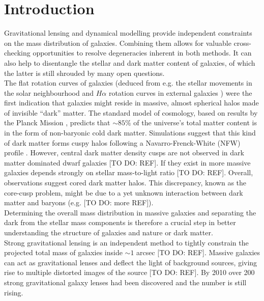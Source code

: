 \section{Introduction}

Gravitational lensing and dynamical modelling provide independent constraints on the mass distribution of galaxies. Combining them allows for valuable cross-checking opportunities to resolve degeneracies inherent in both methods. It can also help to disentangle the stellar and dark matter content of galaxies, of which the latter is still shrouded by many open questions.\\

The flat rotation curves of galaxies (deduced from e.g. the stellar movements in the solar neighbourhood \citep{1932BAN.....6..249O} and $H\alpha$ rotation curves in external galaxies \citep{1978ApJ...225L.107R}) were the first indication that galaxies might reside in massive, almost spherical halos made of invisible ``dark'' matter. The standard model of cosmology, based on results by the Planck Mission \citep{WMAP5cosm}, predicts that $\sim 85\%$ of the universe's total matter content is in the form of non-baryonic cold dark matter. Simulations suggest that this kind of dark matter forms cuspy halos following a Navarro-Frenck-White (NFW) profile \citep{NFW96}. However, central dark matter density cusps are not observed in dark matter dominated dwarf galaxies [TO DO: REF]. If they exist in more massive galaxies depends strongly on stellar mass-to-light ratio [TO DO: REF]. Overall, observations suggest cored dark matter halos. This discrepancy, known as the core-cusp problem, might be due to a yet unknown interaction between dark matter and baryons (e.g. \citealt{2001ApJ...560..636E} [TO DO: more REF]).\\

Determining the overall mass distribution in massive galaxies and separating the dark from the stellar mass components is therefore a crucial step in better understanding the structure of galaxies and nature or dark matter.\\

Strong gravitational lensing is an independent method to tightly constrain the projected total mass of galaxies inside $\sim 1$ arcsec [TO DO: REF]. Massive galaxies can act as gravitational lenses and deflect the light of background sources, giving rise to multiple distorted images of the source [TO DO: REF]. By 2010 over 200 strong gravitational galaxy lenses had been discovered \citep{2010ARA&A..48...87T} and the number is still rising.\\

